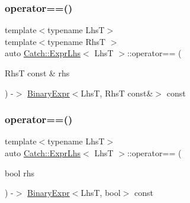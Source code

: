 \subsubsection{\texorpdfstring{operator==()}{operator==()}\hspace{0.1cm}{\footnotesize\ttfamily [1/2]}}
{\footnotesize\ttfamily template$<$typename LhsT$>$ \\
template$<$typename RhsT $>$ \\
auto \mbox{\hyperlink{class_catch_1_1_expr_lhs}{Catch\+::\+Expr\+Lhs}}$<$ LhsT $>$\+::operator== (\begin{DoxyParamCaption}\item[{RhsT const \&}]{rhs }\end{DoxyParamCaption}) -\/$>$ \mbox{\hyperlink{class_catch_1_1_binary_expr}{Binary\+Expr}}$<$LhsT, RhsT const\&$>$ const \hspace{0.3cm}{\ttfamily [inline]}}

\mbox{\label{class_catch_1_1_expr_lhs_ab707a84abdffbdc35962a495e238d393}} 
\subsubsection{\texorpdfstring{operator==()}{operator==()}\hspace{0.1cm}{\footnotesize\ttfamily [2/2]}}
{\footnotesize\ttfamily template$<$typename LhsT$>$ \\
auto \mbox{\hyperlink{class_catch_1_1_expr_lhs}{Catch\+::\+Expr\+Lhs}}$<$ LhsT $>$\+::operator== (\begin{DoxyParamCaption}\item[{bool}]{rhs }\end{DoxyParamCaption}) -\/$>$ \mbox{\hyperlink{class_catch_1_1_binary_expr}{Binary\+Expr}}$<$LhsT, bool$>$ const \hspace{0.3cm}{\ttfamily [inline]}}

\mbox{\label{class_catch_1_1_expr_lhs_ae9b4ee923b90af22c9e39261c2f03cd3}} 
